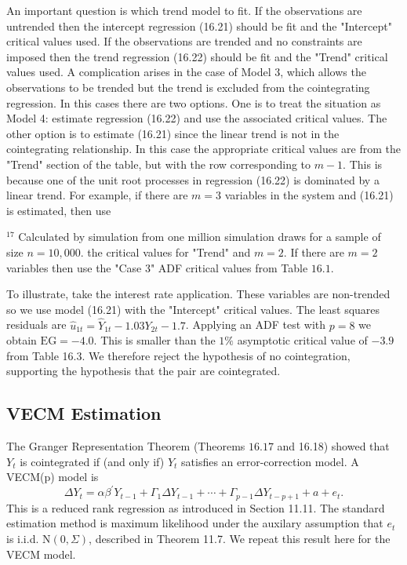 \documentclass[10pt]{article}
\begin{document}
An important question is which trend model to fit. If the observations are untrended then the intercept regression (16.21) should be fit and the "Intercept" critical values used. If the observations are trended and no constraints are imposed then the trend regression (16.22) should be fit and the "Trend" critical values used. A complication arises in the case of Model 3, which allows the observations to be trended but the trend is excluded from the cointegrating regression. In this cases there are two options. One is to treat the situation as Model 4: estimate regression (16.22) and use the associated critical values. The other option is to estimate (16.21) since the linear trend is not in the cointegrating relationship. In this case the appropriate critical values are from the "Trend" section of the table, but with the row corresponding to $m-1$. This is because one of the unit root processes in regression (16.22) is dominated by a linear trend. For example, if there are $m=3$ variables in the system and (16.21) is estimated, then use

${ }^{17}$ Calculated by simulation from one million simulation draws for a sample of size $n=10,000$. the critical values for "Trend" and $m=2$. If there are $m=2$ variables then use the "Case 3" ADF critical values from Table $16.1$.

To illustrate, take the interest rate application. These variables are non-trended so we use model (16.21) with the "Intercept" critical values. The least squares residuals are $\widehat{u}_{1 t}=\widehat{Y}_{1 t}-1.03 Y_{2 t}-1.7$. Applying an ADF test with $p=8$ we obtain $\mathrm{EG}=-4.0$. This is smaller than the $1 \%$ asymptotic critical value of $-3.9$ from Table 16.3. We therefore reject the hypothesis of no cointegration, supporting the hypothesis that the pair are cointegrated.

\subsection{VECM Estimation}
The Granger Representation Theorem (Theorems $16.17$ and 16.18) showed that $Y_{t}$ is cointegrated if (and only if) $Y_{t}$ satisfies an error-correction model. A VECM(p) model is
$$
\Delta Y_{t}=\alpha \beta^{\prime} Y_{t-1}+\Gamma_{1} \Delta Y_{t-1}+\cdots+\Gamma_{p-1} \Delta Y_{t-p+1}+a+e_{t} .
$$
This is a reduced rank regression as introduced in Section 11.11. The standard estimation method is maximum likelihood under the auxilary assumption that $e_{t}$ is i.i.d. $\mathrm{N}(0, \Sigma)$, described in Theorem 11.7. We repeat this result here for the VECM model.
\end{document}

